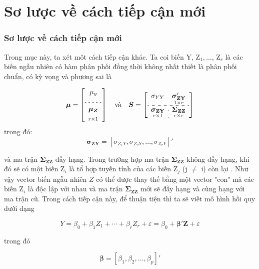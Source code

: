 \section{Sơ lược về cách tiếp cận mới}

\begin{frame}
    \frametitle{Sơ lược về cách tiếp cận mới}
    \begin{footnotesize}
         Trong mục này, ta xét môt cách tiếp cận khác.
         Ta coi biến Y, Z$_1, \ldots$, Z$_r$ là các biến ngẫu nhiên có hàm phân phối đồng thời không nhất thiết là phân phối chuẩn, có kỳ vọng và phương sai là

        \begin{footnotesize}
            \[
            \boldsymbol{\mu} = \begin{bmatrix} \mu_y \\ _\text{- - - - -} \\ \boldsymbol{\mu_Z} \\_{r \times 1}\end{bmatrix}
            \quad
            \text{và} \quad \boldsymbol{S}=\left[\begin{array}{c:c}
            \sigma_{Y Y} & \underset{1 \times r}{\boldsymbol{\sigma}_{\mathbf{Z Y}}^{\prime}} \\
            \hdashline \underset{r \times 1}{\boldsymbol{\sigma}_{\mathbf{Z Y}}} & \underset{r \times r}{\boldsymbol{\Sigma}_{\mathbf{Z Z}}} 
            \end{array}\right] \]
        trong đó:
            \[
            \boldsymbol{\sigma_{ZY}} = [\sigma_{Z_1 Y}, \sigma_{Z_2 Y}, \dots ,  \sigma_{Z_r Y}]'
            \]
        \end{footnotesize}

        và ma trận $\boldsymbol{\Sigma_{ZZ}}$ đầy hạng.
        Trong trường hợp ma trận $\boldsymbol{\Sigma_{ZZ}}$ không đầy hạng, khi đó sẽ có một biến Z$_i$ là tổ hợp tuyến tính của các biến Z$_j$ (j $\neq$ i) còn lại .
        Như vậy vector biến ngẫu nhiên $Z$ có thể được thay thế bằng một vector "con" mà các biến Z$_i$ là độc lập với nhau và ma trận $\boldsymbol{\Sigma_{ZZ}}$ mới sẽ đầy hạng và cùng hạng với ma trận cũ.
        Trong cách tiếp cận này, để thuận tiện thì ta sẽ viết mô hình hồi quy dưới dạng

        \[
        Y = \beta_0 + \beta_1 Z_1 + \cdots + \beta_r Z_r + \varepsilon = \beta_0 + \boldsymbol{\beta'Z} + \varepsilon
        \]

        trong đó

        \[
        \boldsymbol{\beta} = [\beta_1, \beta_2, \ldots, \beta_p]'
        \]
     \end{footnotesize}
\end{frame}
